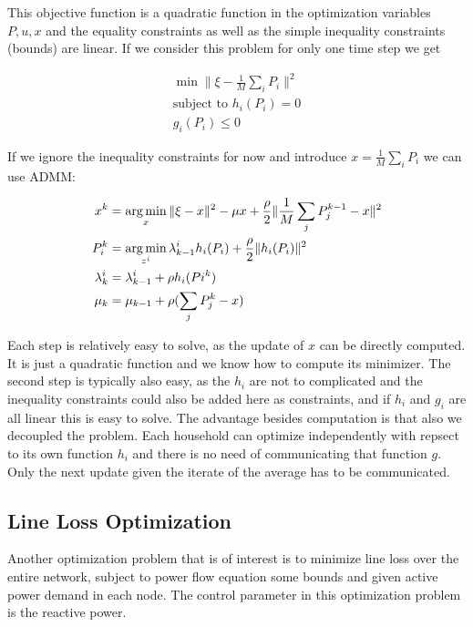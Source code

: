 This objective function is a quadratic function in the optimization variables $P,u,x$ and the equality constraints as well as the simple inequality constraints (bounds) are linear. If we consider this problem for only one time step we get

 \begin{align}
\min  \|\xi-\frac{1}{M}\sum_i P_i\|^2\\
\mbox{subject to } h_i(P_i)=0\\
g_i(P_i)\leq 0\end{align}

If we ignore the inequality constraints for now and introduce $x=\frac{1}{M}\sum_i P_i$ we can use ADMM:

\begin{subequations}
\label{ADMMmodelPower}
\begin{align}
x^k&=\operatorname*{arg\,min}_x  \|\xi-x\|^2- \mu x+\frac{\rho}{2}\|\frac{1}{M}\sum_j P_j^{k-1}-x\|^2\\
P_i^k&=\operatorname*{arg\,min}_{z^i}   \lambda_{k-1}^ih_i(P_i)+\frac{\rho}{2} \|h_i(P_i)\|^2\\
\lambda^i_k&=\lambda^i_{k-1}+\rho h_i(Pi^k)\\
\mu_{k}&=\mu_{k-1}+\rho(\sum_j P_j^k -x)
\end{align}
\end{subequations}

Each step is relatively easy to solve, as the update of $x$ can be directly computed. It is just a quadratic function and we know how to compute its minimizer. The second step is typically also easy, as the $h_i$ are not to complicated and the inequality constraints could also be added here as constraints, and if $h_i$ and $g_i$ are all linear this is easy to solve. The advantage besides computation is that also we decoupled the problem. Each household can optimize independently with repsect to its own function $h_i$ and there is no need of communicating that function $g$. Only the next update given the iterate of the average has to be communicated.



\subsection{Line Loss Optimization}

Another optimization problem that is of interest is to minimize line loss over the entire network, subject to power flow equation some bounds and given active power demand in each node. The control parameter in this optimization problem is the reactive power.

